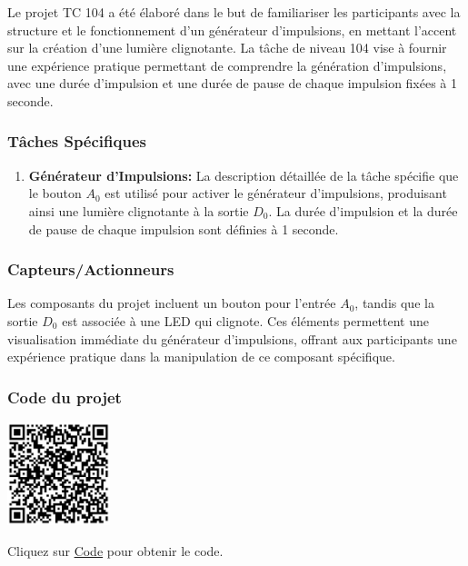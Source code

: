 \documentclass[a4paper,12pt]{report}
\begin{document}
Le projet TC 104 a été élaboré dans le but de familiariser les participants avec la structure et le fonctionnement d'un générateur d'impulsions, en mettant l'accent sur la création d'une lumière clignotante. La tâche de niveau 104 vise à fournir une expérience pratique permettant de comprendre la génération d'impulsions, avec une durée d'impulsion et une durée de pause de chaque impulsion fixées à 1 seconde.

\subsubsection{Tâches Spécifiques}

\begin{enumerate}
    \item \textbf{Générateur d'Impulsions:} La description détaillée de la tâche spécifie que le bouton \(A_0\) est utilisé pour activer le générateur d'impulsions, produisant ainsi une lumière clignotante à la sortie \(D_0\). La durée d'impulsion et la durée de pause de chaque impulsion sont définies à 1 seconde.
\end{enumerate}

\subsubsection{Capteurs/Actionneurs}

Les composants du projet incluent un bouton pour l'entrée \(A_0\), tandis que la sortie \(D_0\) est associée à une LED qui clignote. Ces éléments permettent une visualisation immédiate du générateur d'impulsions, offrant aux participants une expérience pratique dans la manipulation de ce composant spécifique.

\subsubsection{Code du projet}

\begin{minipage}{0.5\textwidth}
    \includegraphics[height=3cm]{Code TC104.png}
\end{minipage}%
\begin{minipage}{0.5\textwidth}
    Cliquez sur \href{https://github.com/DexterTaha/Controllino-PLC-Sample/blob/main/TC100/TC104_G%C3%A9n%C3%A9rateur_d'impulsions/TC104_G%C3%A9n%C3%A9rateur_d'impulsions.ino}{Code} pour obtenir le code.
\end{minipage}
\end{document}
